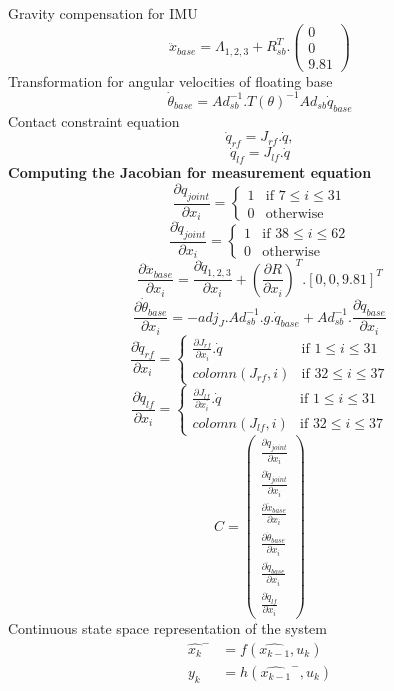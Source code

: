 \documentclass[12pt]{article}
\def\dfdx#1#2{\frac{\partial {#1}}{\partial {#2}}}
\begin{document}
Gravity compensation for IMU
$$
\ddot{x}_{base} = \Lambda_{1,2,3} + R_{sb}^{T}.
\begin{pmatrix}
0\\0\\9.81
\end{pmatrix}
$$
Transformation for angular velocities of floating base
$$\dot{\theta}_{base} = Ad_{sb}^{-1}.T(\theta)^{-1}Ad_{sb}\dot{q}_{base}$$
Contact constraint equation 
$$\dot{q}_{rf} = J_{rf}.\dot{q},$$ $$\dot{q}_{lf} = J_{lf}.\dot{q}$$
\textbf{Computing the Jacobian for measurement equation}
 \[
 \dfdx{q_{joint}}{x_{i}} =
 \begin{cases}
 1 & \text{if } 7 \leq i \leq 31 \\
 0 & \text{otherwise}
 \end{cases}
 \]
  \[
 \dfdx{\dot{q}_{joint}}{x_{i}} =
 \begin{cases}
 1 & \text{if } 38 \leq i \leq 62 \\
 0 & \text{otherwise}
 \end{cases}
 \]
$$ \dfdx{\ddot{x}_{base}}{x_{i}} = \dfdx{\ddot{q}_{1,2,3}}{x_{i}} + \left(\dfdx{R}{x_{i}}\right)^{T}.[0,0,9.81]^{T} $$
$$\dfdx{\dot{\theta}_{base}}{x_{i}} = -adj_{J}.Ad_{sb}^{-1}.g.\dot{q}_{base} + Ad_{sb}^{-1}.\dfdx{\dot{q}_{base}}{x_{i}}$$
\[
\dfdx{\dot{q}_{rf}}{x_{i}} = 
	\begin{cases}
	\dfdx{J_{rf}}{x_{i}}.\dot{q} & \text{if } 1 \leq i \leq 31 \\
	colomn(J_{rf},i) 	& \text{if } 32 \leq i \leq 37
	\end{cases}
\]
\[
\dfdx{\dot{q}_{lf}}{x_{i}} = 
	\begin{cases}
	\dfdx{J_{lf}}{x_{i}}.\dot{q} & \text{if } 1 \leq i \leq 31 \\
	colomn(J_{lf},i) 	& \text{if } 32 \leq i \leq 37
	\end{cases}
\]
\begin{equation}
C = 
	\begin{pmatrix}
	 \dfdx{q_{joint}}{x_{i}} \\
	 \dfdx{\dot{q}_{joint}}{x_{i}}\\
	 \dfdx{\ddot{x}_{base}}{x_{i}}\\
	 \dfdx{\dot{\theta}_{base}}{x_{i}}\\
	 \dfdx{\dot{q}_{base}}{x_{i}}\\
	 \dfdx{\dot{q}_{lf}}{x_{i}}
	\end{pmatrix}
\end{equation}
Continuous state space representation of the system
\begin{equation}\label{xx}
	\begin{split}
	\hat{x_{k}}^{-} &= f(\hat{x_{k-1}},u_{k}) \\ 
	y_{k} &= h(\hat{x_{k-1}}^{-},u_{k})\\
	\end{split}
\end{equation}
\end{document}
